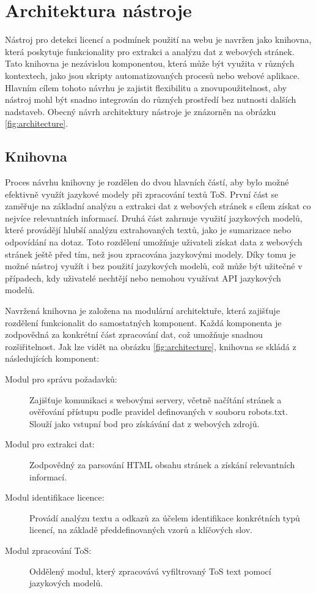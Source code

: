 \section{Architektura nástroje}
Nástroj pro detekci licencí a podmínek použití na webu je navržen jako knihovna, která poskytuje funkcionality pro extrakci a analýzu dat z webových stránek.
Tato knihovna je nezávislou komponentou, která může být využita v různých kontextech, jako jsou skripty automatizovaných procesů nebo webové aplikace.
Hlavním cílem tohoto návrhu je zajistit flexibilitu a znovupoužitelnost, aby nástroj mohl být snadno integrován do různých prostředí bez nutnosti dalších nadstaveb.
Obecný návrh architektury nástroje je znázorněn na obrázku \ref{fig:architecture}.

\subsection{Knihovna}
Proces návrhu knihovny je rozdělen do dvou hlavních částí, aby bylo možné efektivně využít jazykové modely při zpracování textů ToS.
První část se zaměřuje na základní analýzu a extrakci dat z webových stránek s cílem získat co nejvíce relevantních informací.
Druhá část zahrnuje využití jazykových modelů, které provádějí hlubší analýzu extrahovaných textů, jako je sumarizace nebo odpovídání na dotaz.
Toto rozdělení umožňuje uživateli získat data z webových stránek ještě před tím, než jsou zpracována jazykovými modely.
Díky tomu je možné nástroj využít i bez použití jazykových modelů, což může být užitečné v případech, kdy uživatelé nechtějí nebo nemohou využívat API jazykových modelů.

Navržená knihovna je založena na modulární architektuře, která zajišťuje rozdělení funkcionalit do samostatných komponent.
Každá komponenta je zodpovědná za konkrétní část zpracování dat, což umožňuje snadnou rozšiřitelnost.
Jak lze vidět na obrázku \ref{fig:architecture}, knihovna se skládá z následujících komponent:
\begin{description}
    \item[Modul pro správu požadavků:] Zajišťuje komunikaci s webovými servery, včetně načítání stránek a ověřování přístupu podle pravidel definovaných v souboru robots.txt. Slouží jako vstupní bod pro získávání dat z webových zdrojů.
    \item[Modul pro extrakci dat:] Zodpovědný za parsování HTML obsahu stránek a získání relevantních informací.
    \item[Modul identifikace licence:] Provádí analýzu textu a odkazů za účelem identifikace konkrétních typů licencí, na základě předdefinovaných vzorů a klíčových slov.
    \item[Modul zpracování ToS:] Oddělený modul, který zpracovává vyfiltrovaný ToS text pomocí jazykových modelů.
\end{description}

